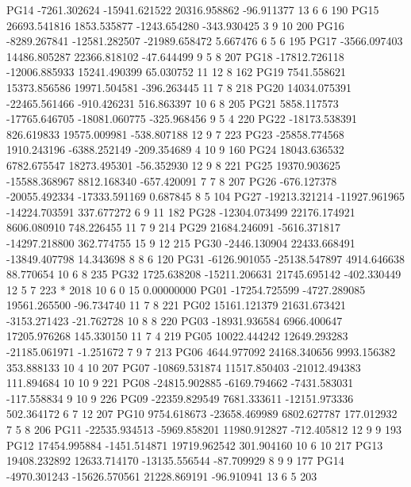 PG14  -7261.302624 -15941.621522  20316.958862    -96.911377 13  6  6 190       
PG15  26693.541816   1853.535877  -1243.654280   -343.930425  3  9 10 200       
PG16  -8289.267841 -12581.282507 -21989.658472      5.667476  6  5  6 195       
PG17  -3566.097403  14486.805287  22366.818102    -47.644499  9  5  8 207       
PG18 -17812.726118 -12006.885933  15241.490399     65.030752 11 12  8 162       
PG19   7541.558621  15373.856586  19971.504581   -396.263445 11  7  8 218       
PG20  14034.075391 -22465.561466   -910.426231    516.863397 10  6  8 205       
PG21   5858.117573 -17765.646705 -18081.060775   -325.968456  9  5  4 220       
PG22 -18173.538391    826.619833  19575.009981   -538.807188 12  9  7 223       
PG23 -25858.774568   1910.243196  -6388.252149   -209.354689  4 10  9 160       
PG24  18043.636532   6782.675547  18273.495301    -56.352930 12  9  8 221       
PG25  19370.903625 -15588.368967   8812.168340   -657.420091  7  7  8 207       
PG26   -676.127378 -20055.492334 -17333.591169      0.687845  8     5 104       
PG27 -19213.321214 -11927.961965 -14224.703591    337.677272  6  9 11 182       
PG28 -12304.073499  22176.174921   8606.080910    748.226455 11  7  9 214       
PG29  21684.246091  -5616.371817 -14297.218800    362.774755 15  9 12 215       
PG30  -2446.130904  22433.668491 -13849.407798     14.343698  8  8  6 120       
PG31  -6126.901055 -25138.547897   4914.646638     88.770654 10  6  8 235       
PG32   1725.638208 -15211.206631  21745.695142   -402.330449 12  5  7 223       
*  2018 10  6  0 15  0.00000000
PG01 -17254.725599  -4727.289085  19561.265500    -96.734740 11  7  8 221       
PG02  15161.121379  21631.673421  -3153.271423    -21.762728 10  8  8 220       
PG03 -18931.936584   6966.400647  17205.976268    145.330150 11  7  4 219       
PG05  10022.444242  12649.293283 -21185.061971     -1.251672  7  9  7 213       
PG06   4644.977092  24168.340656   9993.156382    353.888133 10  4 10 207       
PG07 -10869.531874  11517.850403 -21012.494383    111.894684 10 10  9 221       
PG08 -24815.902885  -6169.794662  -7431.583031   -117.558834  9 10  9 226       
PG09 -22359.829549   7681.333611 -12151.973336    502.364172  6  7 12 207       
PG10   9754.618673 -23658.469989   6802.627787    177.012932  7  5  8 206       
PG11 -22535.934513  -5969.858201  11980.912827   -712.405812 12  9  9 193       
PG12  17454.995884  -1451.514871  19719.962542    301.904160 10  6 10 217       
PG13  19408.232892  12633.714170 -13135.556544    -87.709929  8  9  9 177       
PG14  -4970.301243 -15626.570561  21228.869191    -96.910941 13  6  5 203       
